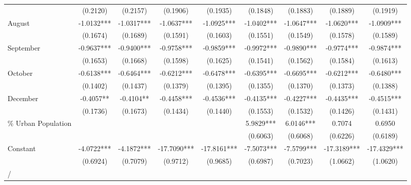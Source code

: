 \begin{table}[htbp]
\begin{tabular}{l*{8}{c}}
                    &    (0.2120)   &    (0.2157)   &    (0.1906)   &    (0.1935)   &    (0.1848)   &    (0.1883)   &    (0.1889)   &    (0.1919)   \\
August              &     -1.0132***&     -1.0317***&     -1.0637***&     -1.0925***&     -1.0402***&     -1.0647***&     -1.0620***&     -1.0909***\\
                    &    (0.1674)   &    (0.1689)   &    (0.1591)   &    (0.1603)   &    (0.1551)   &    (0.1549)   &    (0.1578)   &    (0.1589)   \\
September           &     -0.9637***&     -0.9400***&     -0.9758***&     -0.9859***&     -0.9972***&     -0.9890***&     -0.9774***&     -0.9874***\\
                    &    (0.1653)   &    (0.1668)   &    (0.1598)   &    (0.1625)   &    (0.1541)   &    (0.1562)   &    (0.1584)   &    (0.1613)   \\
October             &     -0.6138***&     -0.6464***&     -0.6212***&     -0.6478***&     -0.6395***&     -0.6695***&     -0.6212***&     -0.6480***\\
                    &    (0.1402)   &    (0.1437)   &    (0.1379)   &    (0.1395)   &    (0.1355)   &    (0.1370)   &    (0.1373)   &    (0.1388)   \\
December            &     -0.4057** &     -0.4104** &     -0.4458***&     -0.4536***&     -0.4135***&     -0.4227***&     -0.4435***&     -0.4515***\\
                    &    (0.1736)   &    (0.1673)   &    (0.1434)   &    (0.1440)   &    (0.1553)   &    (0.1532)   &    (0.1426)   &    (0.1431)   \\
\% Urban Population &               &               &               &               &      5.9829***&      6.0146***&      0.7074   &      0.6950   \\
                    &               &               &               &               &    (0.6063)   &    (0.6068)   &    (0.6226)   &    (0.6189)   \\
Constant            &     -4.0722***&     -4.1872***&    -17.7090***&    -17.8161***&     -7.5073***&     -7.5799***&    -17.3189***&    -17.4329***\\
                    &    (0.6924)   &    (0.7079)   &    (0.9712)   &    (0.9685)   &    (0.6987)   &    (0.7023)   &    (1.0662)   &    (1.0620)   \\
\hline
/                   &               &               &               &               &               &               &               &               \\

\end{tabular}
\end{table}
